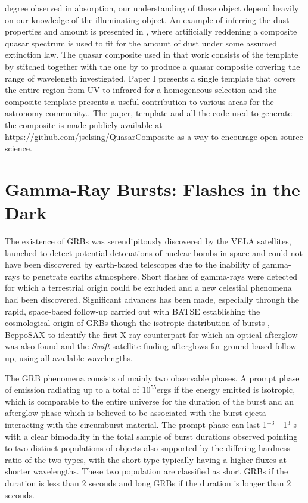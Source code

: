 degree observed in
absorption, our understanding of these object depend heavily
on our knowledge of
the illuminating object. An example of inferring the dust
properties and amount
is presented in \citet{Krogager2015}, where artificially
reddening a composite quasar
spectrum is used to fit for the amount of dust
under some assumed extinction
law. The quasar composite used in that work
consists of the template by
\citet{Vandenberk2001} stitched together with the
one by \citet{Glikman2006} to
produce a quasar composite covering the range of
wavelength investigated. Paper
I presents a single template that covers the
entire region from UV to infrared for a homogeneous
selection and the composite template presents a
useful contribution to various areas for the astronomy community.. The paper,
template and all the code used to generate the composite is made publicly
available at \url{https://github.com/jselsing/QuasarComposite} as a way to
encourage open source science.



\section{Gamma-Ray Bursts: Flashes in the Dark}
\label{sec:intro:grb}

The existence of GRBs was serendipitously discovered by the VELA satellites,
launched to detect potential detonations of nuclear bombs in space and
could not
have been discovered by earth-based telescopes due to the inability of
gamma-rays to penetrate earths atmosphere. Short flashes of gamma-rays were
detected for which a terrestrial origin could be excluded and a new celestial
phenomena had been discovered. 
Significant advances has been made, especially
through the rapid, space-based
follow-up carried out with BATSE
\citep{Harmon2004} establishing the
cosmological origin of GRBs though the
isotropic distribution of bursts
\citep{Meegan1992},  BeppoSAX
\citep{Boella1997} 
to identify the first X-ray counterpart \citep{Costa1997}
for which an optical
afterglow was also found and the \textit{Swift}-satellite
\citep{Gehrels2004} finding afterglows for ground based follow-up, using all
available wavelengths. 

The GRB phenomena consists of mainly two observable phases. A prompt phase of
emission radiating up to a total of $10^{55} $ergs if the energy emitted
is
isotropic, which is comparable to the entire universe \citep{Kumar2014} for
the
duration of the burst and an afterglow phase which is believed to be
associated
with the burst ejecta interacting with the circumburst material. The
prompt
phase can last 1$^{-3}$ - 1$^3$ s with a clear bimodality in the total
sample of
burst durations observed pointing to two distinct populations of objects also
supported
by the differing hardness ratio of the two types, with the short type
typically
having a higher fluxes at shorter wavelengths. These two population
are
classified as short GRBs if the duration is less than 2 seconds and long
GRBs if
the duration is longer than 2 seconds. 

